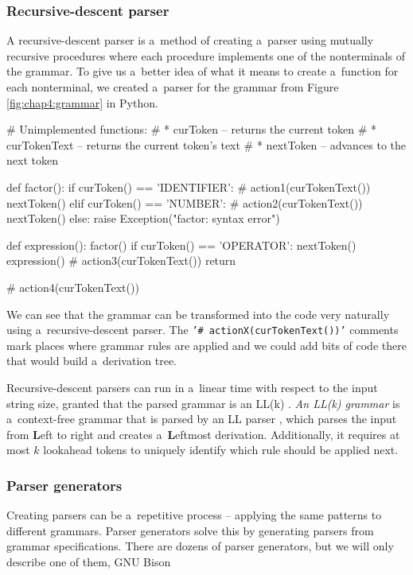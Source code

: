 \subsubsection*{Recursive-descent parser}
A recursive-descent parser is a~method of creating a~parser using mutually recursive procedures where each procedure implements one of the nonterminals
of the grammar. To give us a~better idea of what it means to create a~function for each nonterminal, we created a~parser for the grammar from Figure
\ref{fig:chap4:grammar} in Python.
\begin{code}
# Unimplemented functions:
#   * curToken -- returns the current token
#   * curTokenText -- returns the current token's text
#   * nextToken -- advances to the next token

def factor():
    if curToken() == 'IDENTIFIER':
        # action1(curTokenText())
        nextToken()
    elif curToken() == 'NUMBER':
        # action2(curTokenText())
        nextToken() 
    else:
        raise Exception("factor: syntax error")

def expression():
    factor()
    if curToken() == 'OPERATOR':
        nextToken()
        expression()
        # action3(curTokenText())
        return

    # action4(curTokenText())
\end{code}

We can see that the grammar can be transformed into the code very naturally using a~recursive-descent parser. The \texttt{'\# actionX(curTokenText())'} comments
mark places where grammar rules are applied and we could add bits of code there that would build a~derivation tree.

Recursive-descent parsers can run in a~linear time with respect to the input string size, granted that the parsed grammar is an LL(k) \cite{aho_sethi_ullman_2002}.
\emph{An LL(k) grammar} is a~context-free grammar that is parsed by an LL parser \cite{aho_sethi_ullman_2002}, which parses the input from \textbf{L}eft
to right and creates a~\textbf{L}eftmost derivation. Additionally, it requires at most $k$ lookahead tokens to uniquely identify which rule should be applied next.

\subsubsection*{Parser generators}
Creating parsers can be a~repetitive process -- applying the same patterns to different grammars. Parser generators solve this by generating parsers from grammar
specifications. There are dozens of parser generators, but we will only describe one of them, GNU Bison \cite{Bison}

